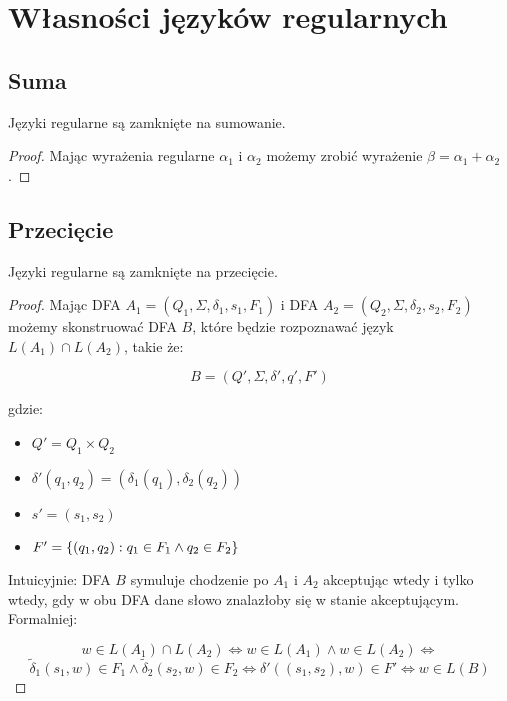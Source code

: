 \section{Własności języków regularnych}

\subsection{Suma}

\begin{theorem}
	Języki regularne są zamknięte na sumowanie.
\end{theorem}
\begin{proof}
	Mając wyrażenia regularne \(\alpha_1\) i \(\alpha_2\) możemy zrobić wyrażenie \(\beta = \alpha_1 + \alpha_2\).
\end{proof}

\subsection{Przecięcie}
\begin{theorem}
	Języki regularne są zamknięte na przecięcie.
\end{theorem}
\begin{proof}
	Mając DFA \(A_1 = (Q_1, \Sigma, \delta_1, s_1, F_1)\) i DFA \(A_2 = (Q_2, \Sigma, \delta_2, s_2, F_2)\) możemy skonstruować DFA \(B\), które będzie rozpoznawać język \(L(A_1) \cap L(A_2)\), takie że:

	\[
		B = (Q', \Sigma, \delta', q', F')
	\]

	gdzie:

	\begin{itemize}
		\item \( Q' = Q_1 \times Q_2 \)
		\item \( \delta'(q_1, q_2) = (\delta_1(q_1), \delta_2(q_2)) \)
		\item \( s' = (s_1, s_2) \)
		\item \( F' = \set{(q_1, q_2) : q_1 \in F_1 \land q_2 \in F_2} \)

	\end{itemize}

	Intuicyjnie: DFA \(B\) symuluje chodzenie po \(A_1\) i \(A_2\) akceptując wtedy i tylko wtedy, gdy w obu DFA dane słowo znalazłoby się w stanie akceptującym. Formalniej:

	\[
		w \in L(A_1) \cap L(A_2) \iff w \in L(A_1) \land w \in L(A_2) \iff
	\]
	\[
		\tilde \delta_1(s_1, w) \in F_1 \land \tilde \delta_2(s_2, w) \in F_2 \iff \delta'((s_1, s_2), w) \in F' \iff w \in L(B)
	\]

\end{proof}

